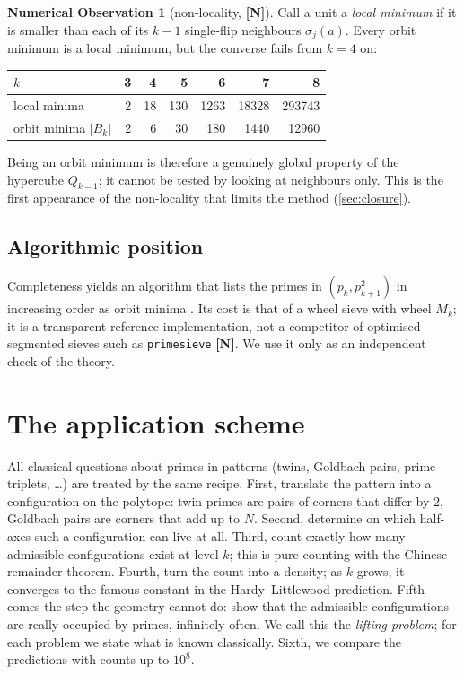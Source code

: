\documentclass[11pt,a4paper]{article}
\newcommand{\statN}{\textsf{\textbf{[N]}}}
\theoremstyle{plain}
\theoremstyle{definition}
\newtheorem{observation}[theorem]{Numerical Observation}
\theoremstyle{remark}
\begin{document}
\begin{observation}[non-locality, \statN]\label{obs:nonlocal}
Call a unit a \emph{local minimum} if it is smaller than each of its $k-1$
single-flip neighbours $\sigma_j(a)$. Every orbit minimum is a local minimum,
but the converse fails from $k=4$ on:
\begin{center}
\begin{tabular}{lrrrrrr}\toprule
$k$ & 3 & 4 & 5 & 6 & 7 & 8\\\midrule
local minima & 2 & 18 & 130 & 1263 & 18328 & 293743\\
orbit minima $|B_k|$ & 2 & 6 & 30 & 180 & 1440 & 12960\\\bottomrule
\end{tabular}
\end{center}
Being an orbit minimum is therefore a genuinely global property of the
hypercube $Q_{k-1}$; it cannot be tested by looking at neighbours only. This is
the first appearance of the non-locality that limits the method
(\cref{sec:closure}).
\end{observation}

\subsection{Algorithmic position}
Completeness yields an algorithm that lists the primes in $(p_k,p_{k+1}^2)$ in
increasing order as orbit minima \cite{K-tool}. Its cost is that of a wheel
sieve with wheel $M_k$; it is a transparent reference implementation, not a
competitor of optimised segmented sieves such as \texttt{primesieve}
\statN. We use it only as an independent check of the theory.

\section{The application scheme}\label{sec:scheme}

\begin{plainwords}
All classical questions about primes in patterns (twins, Goldbach pairs,
prime triplets, \dots) are treated by the same recipe. First, translate the
pattern into a configuration on the polytope: twin primes are pairs of corners
that differ by $2$, Goldbach pairs are corners that add up to $N$. Second,
determine on which half-axes such a configuration can live at all. Third,
count exactly how many admissible configurations exist at level $k$; this is
pure counting with the Chinese remainder theorem. Fourth, turn the count into
a density; as $k$ grows, it converges to the famous constant in the
Hardy--Littlewood prediction. Fifth comes the step the geometry cannot do:
show that the admissible configurations are really occupied by primes,
infinitely often. We call this the \emph{lifting problem}; for each problem we
state what is known classically. Sixth, we compare the predictions with
counts up to $10^8$.
\end{plainwords}
\end{document}

